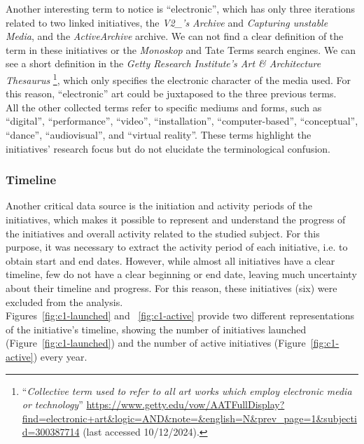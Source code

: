 Another interesting term to notice is ``electronic'', which has only three iterations related to two linked initiatives, the \textit{V2\_’s Archive} and \textit{Capturing unstable Media}, and the \textit{ActiveArchive} archive. We can not find a clear definition of the term in these initiatives or the \textit{Monoskop} and Tate Terms search engines. We can see a short definition in the \textit{Getty Research Institute's Art \& Architecture Thesaurus} \footnote{``\textit{Collective term used to refer to all art works which employ electronic media or technology}” \url{https://www.getty.edu/vow/AATFullDisplay?find=electronic+art&logic=AND&note=&english=N&prev_page=1&subjectid=300387714} (last accessed 10/12/2024).}, which only specifies the electronic character of the media used. For this reason, ``electronic'' art could be juxtaposed to the three previous terms.\\
All the other collected terms refer to specific mediums and forms, such as ``digital'', ``performance'', ``video'', ``installation'', ``computer-based'', ``conceptual'', ``dance'', ``audiovisual'', and ``virtual reality''. These terms highlight the initiatives' research focus but do not elucidate the terminological confusion.

\subsubsection{Timeline}
Another critical data source is the initiation and activity periods of the initiatives, which makes it possible to represent and understand the progress of the initiatives and overall activity related to the studied subject. For this purpose, it was necessary to extract the activity period of each initiative, i.e. to obtain start and end dates. However, while almost all initiatives have a clear timeline, few do not have a clear beginning or end date, leaving much uncertainty about their timeline and progress. For this reason, these initiatives (six) were excluded from the analysis.\\
Figures~\ref{fig:c1-launched} and ~\ref{fig:c1-active} provide two different representations of the initiative's timeline, showing the number of initiatives launched (Figure~\ref{fig:c1-launched}) and the number of active initiatives (Figure~\ref{fig:c1-active}) every year. 


